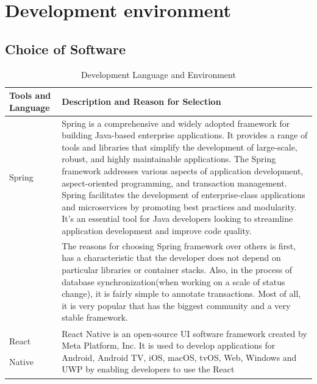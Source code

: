 \documentclass[conference]{IEEEtran}
\begin{document}
\section{Development environment}
    \subsection{Choice of Software}
    
    \begin{table}[htbp]
        \caption{Development Language and Environment}
        \centering
        \begin{tabular}{| p{1.2cm}|p{6.8cm} |} 
             \hline
             Tools and Language & Description and Reason for Selection \\ [0.5ex]
             \hline
             Spring & Spring is a comprehensive and widely adopted framework for building Java-based enterprise applications. It provides a range of tools and libraries that simplify the development of large-scale, robust, and highly maintainable applications. The Spring framework addresses various aspects of application development, aspect-oriented programming, and transaction management. Spring facilitates the development of enterprise-class applications and microservices by promoting best practices and modularity. It's an essential tool for Java developers looking to streamline application development and improve code quality.\\
            &
            The reasons for choosing Spring framework over others is first, has a characteristic that the developer does not depend on particular libraries or container stacks. Also, in the process of database synchronization(when working on a scale of status change), it is fairly simple to annotate transactions. Most of all, it is very popular that has the biggest community and a very stable framework. \\
             \hline
             React
             
             Native & React Native is an open-source UI software framework created by Meta Platform, Inc. It is used to develop applications for Android, Android TV, iOS, macOS, tvOS, Web, Windows and UWP by enabling developers to use the React\\
             \hline
               \end{tabular}
    \end{table}
    
\end{document}
